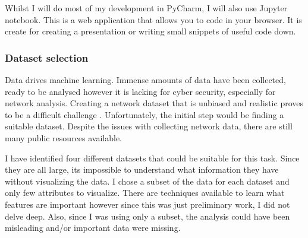 \documentclass[11pt]{article}
\begin{document}
Whilst I will do most of my development in PyCharm, I will also use Jupyter notebook. This is a web application that allows you to code in your browser. It is create for creating a presentation or writing small snippets of useful code down. 

\subsubsection{Dataset selection}
Data drives machine learning. Immense amounts of data have been collected, ready to be analysed however it is lacking for cyber security, especially for network analysis. Creating a network dataset that is unbiased and realistic proves to be a difficult challenge \cite{bg-dataset-selection}. Unfortunately, the initial step would be finding a suitable dataset. Despite the issues with collecting network data, there are still many public resources available. 

I have identified four different datasets that could be suitable for this task. Since they are all large, its impossible to understand what information they have without visualizing the data. I chose a subset of the data for each dataset and only few attributes to visualize. There are techniques available to learn what features are important however since this was just preliminary work, I did not delve deep. Also, since I was using only a subset, the analysis could have been misleading and/or important data were missing.
\end{document}
